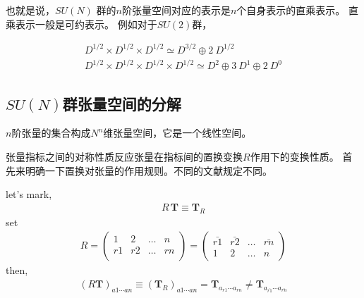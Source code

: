 也就是说，$SU(N)$ 群的$n$阶张量空间对应的表示是$n$个自身表示的直乘表示。
直乘表示一般是可约表示。
例如对于$SU(2)$群，

\begin{example}[SU(2)]
\begin{equation}\begin{aligned}
\label{eq.8.1.3}
D^{1/2}\times D^{1/2}\times D^{1/2}\simeq D^{3/2} \oplus 2 ~ D^{1/2} \\
D^{1/2}\times D^{1/2}\times D^{1/2}\times D^{1/2}\simeq D^{2} \oplus 3~D^{1} \oplus 2~D^{0}
\end{aligned}\end{equation}
\end{example}

\subsection{$SU(N)$群张量空间的分解}
$n$阶张量的集合构成$N^n$维张量空间，它是一个线性空间。

张量指标之间的对称性质反应张量在指标间的置换变换$R$作用下的变换性质。
首先来明确一下置换对张量的作用规则。不同的文献规定不同。

\begin{newprop}
let's mark,
\begin{equation}\begin{aligned}
		\label{eq.8.1.4}
	R\,\mathbf{T}\equiv \mathbf{T}_R
\end{aligned}\end{equation}
set
\begin{equation}\begin{aligned}
\label{eq.8.1.5}
R=
\begin{pmatrix}
1&2&\ldots&n\\
r1&r2&\ldots&rn\\
\end{pmatrix}
=
\begin{pmatrix}
\bar{r1}&\bar{r2}&\ldots&\bar{rn}\\
1&2&\ldots&n
\end{pmatrix}
\end{aligned}\end{equation}
then,
\begin{equation}\begin{aligned}
(R\mathbf{T})_{a1\cdots an}\equiv (\mathbf{T}_R)_{a1\cdots an}=
\mathbf{T}_{a_{r1}\cdots a_{rn}}
\neq
\mathbf{T}_{a_{\bar{r1}}\cdots a_{\bar{rn}}}
\end{aligned}\end{equation}
\end{newprop}

